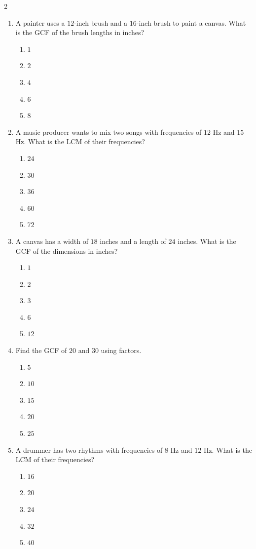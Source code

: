 \documentclass[10pt]{article}
\begin{document}
\begin{multicols}{2}
\begin{enumerate}[label=\textbf{Q\arabic*.}, leftmargin=*, itemsep=6pt, parsep=0pt]
  \item \small A painter uses a $12$-inch brush and a $16$-inch brush to paint a canvas. What is the GCF of the brush lengths in inches?
  \begin{enumerate}[label=(\Alph*), leftmargin=0.6cm, nosep, itemsep=2pt]
    \item $1$
    \item $2$
    \item $4$
    \item $6$
    \item $8$
  \end{enumerate}

  \item \small A music producer wants to mix two songs with frequencies of $12$ Hz and $15$ Hz. What is the LCM of their frequencies?
  \begin{enumerate}[label=(\Alph*), leftmargin=0.6cm, nosep, itemsep=2pt]
    \item $24$
    \item $30$
    \item $36$
    \item $60$
    \item $72$
  \end{enumerate}

  \item \small A canvas has a width of $18$ inches and a length of $24$ inches. What is the GCF of the dimensions in inches?
  \begin{enumerate}[label=(\Alph*), leftmargin=0.6cm, nosep, itemsep=2pt]
    \item $1$
    \item $2$
    \item $3$
    \item $6$
    \item $12$
  \end{enumerate}

  \item \small Find the GCF of $20$ and $30$ using factors.
  \begin{enumerate}[label=(\Alph*), leftmargin=0.6cm, nosep, itemsep=2pt]
    \item $5$
    \item $10$
    \item $15$
    \item $20$
    \item $25$
  \end{enumerate}

  \item \small A drummer has two rhythms with frequencies of $8$ Hz and $12$ Hz. What is the LCM of their frequencies?
  \begin{enumerate}[label=(\Alph*), leftmargin=0.6cm, nosep, itemsep=2pt]
    \item $16$
    \item $20$
    \item $24$
    \item $32$
    \item $40$
  \end{enumerate}


\end{enumerate}
\end{multicols}
\end{document}

